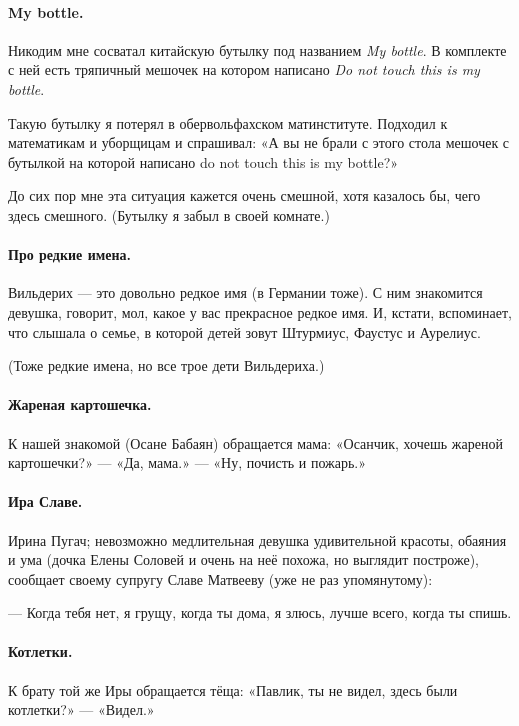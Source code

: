 \documentclass{book}
\begin{document}
\paragraph{My bottle.}
Никодим мне сосватал китайскую бутылку под названием \textit{My bottle}.
В комплекте с ней есть тряпичный мешочек на котором написано \textit{Do not touch this is my bottle}.

Такую бутылку я потерял в обервольфахском матинституте.
Подходил к математикам и уборщицам и спрашивал: «А вы не брали с этого стола мешочек с бутылкой на которой написано do not touch this is my bottle?»

До сих пор мне эта ситуация кажется очень смешной, хотя казалось бы, чего здесь смешного.
(Бутылку я забыл в своей комнате.)

\paragraph{Про редкие имена.}
Вильдерих --- это довольно редкое имя (в Германии тоже).
С ним знакомится девушка, говорит, мол, какое у вас прекрасное редкое имя.
И, кстати, вспоминает, что слышала о семье, в которой детей зовут Штурмиус, Фаустус и Аурелиус.

(Тоже редкие имена, но все трое дети Вильдериха.)

\paragraph{Жареная картошечка.}
К нашей знакомой (Осане Бабаян) обращается мама:
«Осанчик, хочешь жареной картошечки?» --- «Да, мама.» --- «Ну, почисть и пожарь.»

\paragraph{Ира Славе.}
Ирина Пугач; невозможно медлительная девушка удивительной красоты, обаяния и ума (дочка Елены Соловей и очень на неё похожа, но выглядит построже), сообщает своему супругу Славе Матвееву (уже не раз упомянутому):

--- Когда тебя нет, я грущу, когда ты дома, я злюсь, лучше всего, когда ты спишь.

\paragraph{Котлетки.}
К брату той же Иры обращается тёща:
«Павлик, ты не видел, здесь были котлетки?» --- «Видел.»
\end{document}
